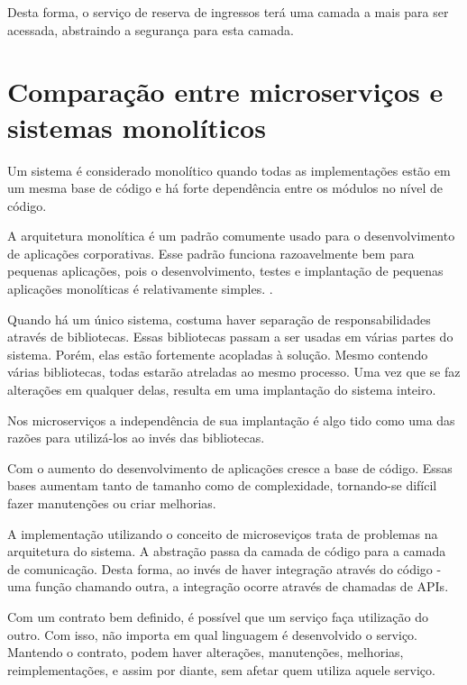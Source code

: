 Desta forma, o serviço de reserva de ingressos terá uma camada a mais
para ser acessada, abstraindo a segurança para esta camada.

\section{Comparação entre microserviços e sistemas monolíticos}\label{microservicos-monoliticos}

Um sistema é considerado monolítico quando todas as implementações estão em um mesma base de código
e há forte dependência entre os módulos no nível de código.


\begin{citacao}
A arquitetura monolítica é um padrão comumente usado para o desenvolvimento de aplicações corporativas.
Esse padrão funciona razoavelmente bem para pequenas aplicações, pois o desenvolvimento, testes e 
implantação de pequenas aplicações monolíticas é relativamente simples.
\cite{arquitetura-monolitica}.
\end{citacao}


Quando há um único sistema, costuma haver separação de responsabilidades através de bibliotecas.
Essas bibliotecas passam a ser usadas em várias partes do sistema. Porém, elas estão fortemente
acopladas à solução.
Mesmo contendo várias bibliotecas, todas estarão atreladas ao mesmo processo.
Uma vez que se faz alterações em qualquer delas, resulta em uma implantação do sistema inteiro.

Nos microserviços a independência de sua implantação é algo tido como uma das razões para
utilizá-los ao invés das bibliotecas.

Com o aumento do desenvolvimento de aplicações cresce a base de código.
Essas bases aumentam tanto de tamanho como de complexidade,
tornando-se difícil fazer manutenções ou criar melhorias.

A implementação utilizando o conceito de microseviços trata de problemas na arquitetura do sistema.
A abstração passa da camada de código para a camada de comunicação. Desta forma, ao invés de haver
integração através do código - uma função chamando outra, a integração ocorre através de chamadas de
APIs.

Com um contrato bem definido, é possível que um serviço faça utilização do outro.
Com isso, não importa em qual linguagem é desenvolvido o serviço.
Mantendo o contrato, podem haver alterações, manutenções, melhorias, reimplementações,
e assim por diante, sem afetar quem utiliza aquele serviço.

